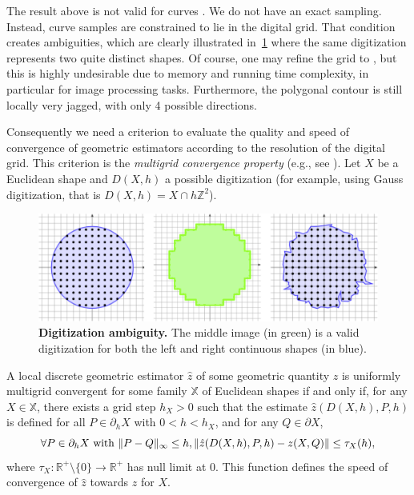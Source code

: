 \documentclass[review]{siamart220329}
\DeclarePairedDelimiter\norm{\lVert}{\rVert}%
\begin{document}
The result above is not valid for curves . We do not have an exact sampling. Instead, curve samples are constrained to lie in the digital grid. That condition creates ambiguities, which are clearly illustrated in~\cref{fig:digitization-ambiguity} where the same digitization represents two quite distinct shapes. Of course, one may refine the grid to , but this is highly undesirable due to memory and running time complexity, in particular for image processing tasks. Furthermore, the polygonal contour is still locally very jagged, with only 4 possible directions. 

Consequently we need a criterion to evaluate the quality and speed
of convergence of geometric estimators according to the resolution of
the digital grid. This criterion is the \emph{multigrid convergence
property} (e.g., see \cite{klette2004digital}). Let $X$ be a Euclidean
shape and $D(X,h)$ a possible digitization (for example, using Gauss
digitization, that is $D(X,h) = X \cap h\mathbb{Z}^2$).
%
%
\begin{figure}
\center
\includegraphics[scale=1]{figures/ambiguity.png}
\caption{\textbf{Digitization ambiguity.} The middle image (in green) is a valid digitization for both the left and right continuous shapes (in blue).}
\label{fig:digitization-ambiguity}
\end{figure}
%
%
\begin{definition}
  A local discrete geometric estimator $\hat{z}$ of some geometric
  quantity $z$ is uniformly multigrid convergent for some family $\mathbb{X}$ of Euclidean shapes if
  and only if, for any $X \in \mathbb{X}$, there exists a grid step
  $h_X>0$ such that the estimate $\hat{z}(D(X,h), P,h)$ is
  defined for all $P \in \partial_hX$ with $ 0 < h < h_X$, and
  for any $Q \in \partial X$,
  \begin{equation*}
    \forall P \in  \partial_hX \text{ with } \norm{ P - Q }_{\infty} \leq h, \norm{ \hat{z}(D(X,h),P,h) - z(X,Q)} \leq \tau_{X}(h),			
  \end{equation*}
  where $\tau_{X}:\mathbb{R}^{+}\setminus\{0\} \rightarrow
  \mathbb{R}^{+}$ has null limit at $0$. This function defines the
  speed of convergence of $\hat{z}$ towards $z$ for $X$.
\end{definition}
	
\end{document}
